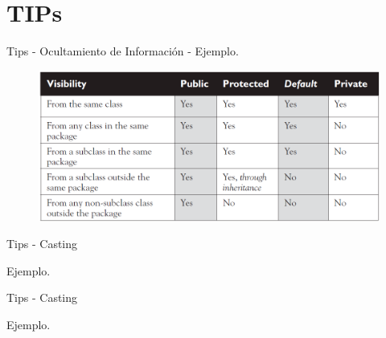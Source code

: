 \section{TIPs}

\begin{frame}{Tips - Ocultamiento de Informaci\'on - Ejemplo.}
  \begin{figure}
    \includegraphics[scale=0.4]{figuras/ocultamiento_tabla.PNG}
  \end{figure}
\end{frame}

\begin{frame}{Tips - Casting}
	\begin{block}{Ejemplo.}

\end{block}
\end{frame}

\begin{frame}{Tips - Casting}
	\begin{block}{Ejemplo.}

\end{block}
\end{frame}

